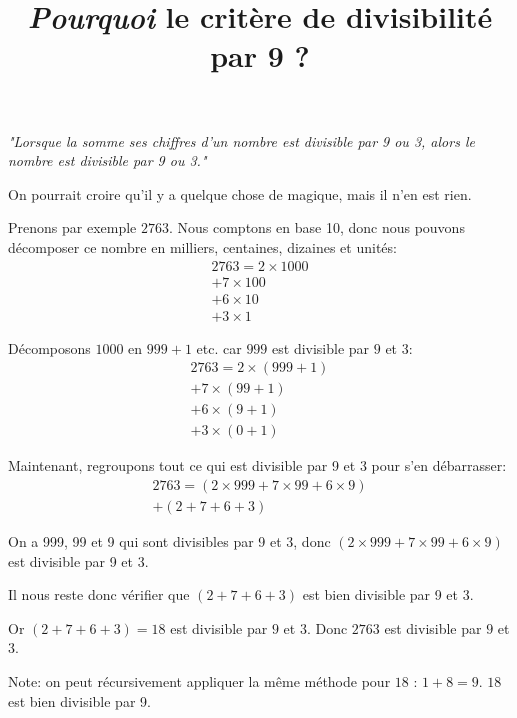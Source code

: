 \documentclass[12pt]{article}
\title{\textit{Pourquoi} le critère de divisibilité par 9 ?}
\begin{document}
\maketitle

\textit{"Lorsque la somme ses chiffres d'un nombre est divisible par 9 ou 3, alors le nombre est divisible par 9 ou 3."}

On pourrait croire qu'il y a quelque chose de magique, mais il n'en est rien.

Prenons par exemple $2763$. Nous comptons en base 10, donc nous pouvons décomposer ce nombre en milliers, centaines, dizaines et unités:
\begin{align*}
    2763 = 2\times1000 \\ + 7\times100 \\ + 6\times10 \\ + 3\times1
\end{align*}

Décomposons $1000$ en $999+1$ etc. car $999$ est divisible par $9$ et $3$:
\begin{align*}
    2763 = 2\times(999 + 1) \\ + 7\times(99 + 1) \\ + 6\times(9 + 1) \\ + 3\times(0 + 1)
\end{align*}

Maintenant, regroupons tout ce qui est divisible par 9 et 3 pour s'en débarrasser:
\begin{align*}
    2763 = (2\times999 + 7\times99 + 6\times9) \\ + (2 + 7 + 6 + 3)
\end{align*}

On a 999, 99 et 9 qui sont divisibles par 9 et 3, donc $(2\times999 + 7\times99 + 6\times9)$ est divisible par 9 et 3.

Il nous reste donc vérifier que $(2 + 7 + 6 + 3)$ est bien divisible par 9 et 3.

Or $(2 + 7 + 6 + 3) = 18$ est divisible par $9$ et $3$.
Donc $2763$ est divisible par $9$ et $3$.

Note: on peut récursivement appliquer la même méthode pour $18$ : $1 + 8 = 9$. $18$ est bien divisible par 9.
\end{document}
